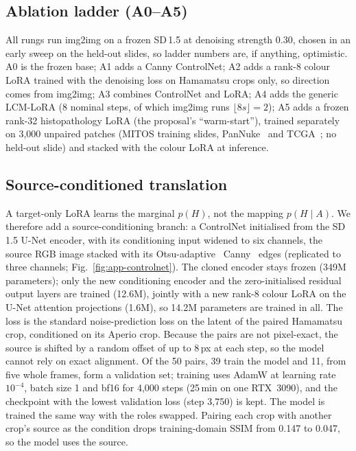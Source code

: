 \subsection{Ablation ladder (A0--A5)}
All rungs run img2img on a frozen SD\,1.5 at denoising strength 0.30, chosen in an early sweep on the
held-out slides, so ladder numbers are, if anything, optimistic. A0 is the frozen base; A1 adds a Canny ControlNet; A2 adds a rank-8 colour LoRA trained with the
denoising loss on Hamamatsu crops only, so direction comes from img2img; A3 combines ControlNet and LoRA;
A4 adds the generic LCM-LoRA (8 nominal steps, of which img2img runs
$\lfloor 8s\rfloor=2$); A5 adds a frozen rank-32 histopathology LoRA (the proposal's ``warm-start''), trained separately on 3{,}000 unpaired
patches (MITOS training slides, PanNuke~\cite{gamper2019pannuke} and TCGA~\cite{tcga2012breast}; no held-out slide) and stacked with
the colour LoRA at inference.

\subsection{Source-conditioned translation}
A target-only LoRA learns the marginal $p(H)$, not the mapping $p(H\mid A)$. We therefore add a
source-conditioning branch: a ControlNet initialised from the SD\,1.5 U-Net encoder, with its conditioning
input widened to six channels, the source RGB image stacked with its Otsu-adaptive~\cite{otsu1979threshold} Canny~\cite{canny1986edge} edges (replicated to three channels; Fig.~\ref{fig:app-controlnet}). The cloned
encoder stays frozen (349M parameters); only the new conditioning encoder and the zero-initialised residual
output layers are trained (12.6M), jointly with a new rank-8 colour LoRA on the U-Net attention projections
(1.6M), so 14.2M parameters are trained in all. The loss is the standard noise-prediction loss on the latent
of the paired Hamamatsu crop, conditioned on its Aperio crop. Because the pairs are not pixel-exact, the source
is shifted by a random offset of up to 8\,px at each step, so the model cannot rely on exact alignment. Of the
50 pairs, 39 train the model and 11, from five whole frames, form a validation set; training uses AdamW at
learning rate $10^{-4}$, batch size 1 and bf16 for 4{,}000 steps (25\,min on one RTX~3090), and the
checkpoint with the lowest validation loss (step 3{,}750) is kept.
The \HtoA{} model is trained the same way with the roles swapped. Pairing each crop with another crop's source as the
condition drops training-domain SSIM from 0.147 to 0.047, so the model uses the source.

